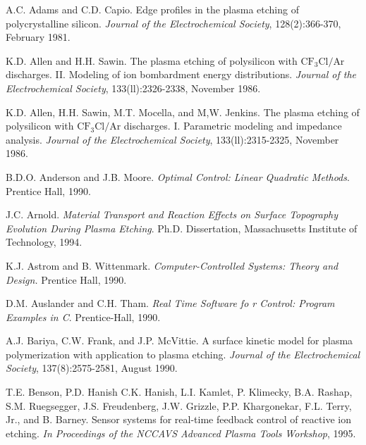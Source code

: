  
 \begin{thebibliography}{100}%
	
	\addtolength{\leftmargin}{0.2in} %
	\setlength{\itemindent}{-0.2in}
	
	 A.C. Adams and C.D. Capio. Edge profiles in the plasma etching of polycrystalline silicon. \emph{Journal of the Electrochemical Society}, 128(2):366-370, February 1981.

	
	 K.D. Allen and H.H. Sawin. The plasma etching of polysilicon with $\text{CF}_{3}\text{Cl}/\text{Ar}$ discharges. II. Modeling of ion bombardment energy distributions. \emph{Journal of the Electrochemical Society}, 133(ll):2326-2338, November 1986.

	
	 K.D. Allen, H.H. Sawin, M.T. Mocella, and M,W. Jenkins. The plasma etching of polysilicon with $\text{CF}_{3}\text{Cl}/\text{Ar}$ discharges. I. Parametric modeling and impedance analysis. \emph{Journal of the Electrochemical Society}, 133(ll):2315-2325, November 1986.
	
	 B.D.O. Anderson and J.B. Moore. \emph{Optimal Control: Linear Quadratic Methods}. Prentice Hall, 1990.
	
	 J.C. Arnold. \emph{Material Transport and Reaction Effects on Surface Topography Evolution During Plasma Etching}. Ph.D. Dissertation, Massachusetts Institute of Technology, 1994.
	
	 K.J. Astrom and B. Wittenmark. \emph{Computer-Controlled Systems: Theory and Design.} Prentice Hall, 1990.

	 D.M. Auslander and C.H. Tham. \emph{Real Time Software fo r Control: Program Examples in C}. Prentice-Hall, 1990.
	
	 A.J. Bariya, C.W. Frank, and J.P. McVittie. A surface kinetic model for plasma polymerization with application to plasma etching. \emph{Journal of the Electrochemical Society}, 137(8):2575-2581, August 1990.
	
	 T.E. Benson, P.D. Hanish C.K. Hanish, L.I. Kamlet, P. Klimecky, B.A. Rashap, S.M. Ruegsegger, J.S. Freudenberg, J.W. Grizzle, P.P. Khargonekar, F.L. Terry, Jr., and B. Barney. Sensor systems for real-time feedback control of reactive ion etching. \emph{In Proceedings of the NCCAVS Advanced Plasma Tools Workshop}, 1995.


\end{thebibliography}
